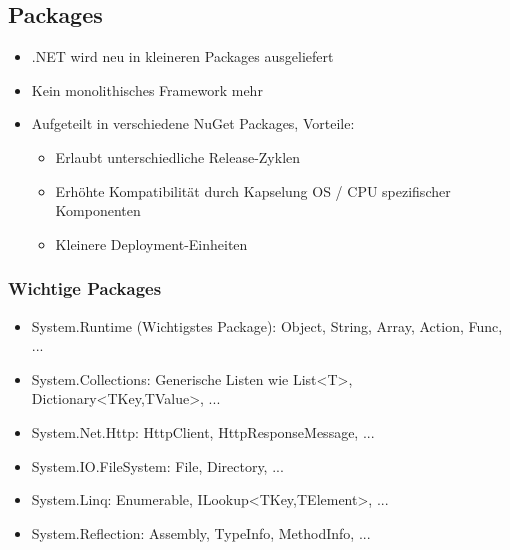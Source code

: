 \begin{multicols*}{2}
\subsection{Packages}
\begin{itemize} 
    \item .NET wird neu in kleineren Packages ausgeliefert
    \item Kein monolithisches Framework mehr
    \item Aufgeteilt in verschiedene NuGet Packages, Vorteile:
    \begin{itemize}
        \item Erlaubt unterschiedliche Release-Zyklen
        \item Erhöhte Kompatibilität durch Kapselung OS / CPU spezifischer Komponenten
        \item Kleinere Deployment-Einheiten
    \end{itemize}
\end{itemize}
\subsubsection{Wichtige Packages}
\begin{itemize}
    \item System.Runtime (Wichtigstes Package): Object, String, Array, Action, Func, ...
    \item System.Collections: Generische Listen wie List<T>, Dictionary<TKey,TValue>, ...
    \item System.Net.Http: HttpClient, HttpResponseMessage, ...
    \item System.IO.FileSystem: File, Directory, ...
    \item System.Linq: Enumerable, ILookup<TKey,TElement>, ...
    \item System.Reflection: Assembly, TypeInfo, MethodInfo, ...
\end{itemize}

\end{multicols*}
